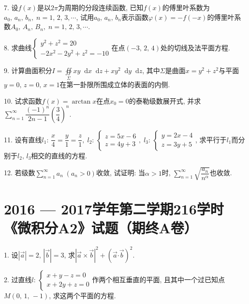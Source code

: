 \documentclass{article}
\newcommand*{\dif}{\mathop{}\!\mathrm{d}}
\begin{document}
7. 设$f(x)$是以$2\pi$为周期的分段连续函数, 已知$f(x)$的傅里叶系数为$a_0,\,a_n,\,b_n,\;n=1,\,2,\,3,\cdots$,  试用$a_0,\,a_n,\,b_n$表示函数$\varphi(x) = -f(-x)$的傅里叶系数$A_0,\,A_n,\,B_n,\;n=1,\,2,\,3,\cdots$.\par

8. 求曲线$\begin{cases}y^2+z^2=20 \\ -2x^2 -2y^2+z^2 = -10\end{cases}$在点$(-3,\,2,\,4)$处的切线及法平面方程.\par

9. 计算曲面积分$I= \displaystyle\oiint\limits_\Sigma{xy \dif x \dif z + xy^2 \dif y \dif z}$, 其中$\Sigma$是曲面$x=y^2+z^2$与平面$y=0,\,z=0,\,x=1$在第一卦限所围成立体的表面的内侧.\par

10. 试求函数$f(x)=\arctan x$在点$x_0 = 0$的泰勒级数展开式, 并求$\displaystyle\sum\limits_{n=1}^\infty{\dfrac{(-1)^n}{2n-1}\left(\dfrac{3}{4}\right)^n}$.\par

11. 设有直线$l_1:\, \dfrac{x}{4}=\dfrac{y}{1}=\dfrac{z}{1}, \; l_2:\, \begin{cases}z=5x-6 \\ z=4y+3\end{cases},\; l_3:\, \begin{cases}y=2x-4 \\ z=3y+5\end{cases}$, 求平行于$l_1$而分别于$l_2,\,l_3$相交的直线的方程.\par

12. 若级数$\displaystyle\sum\limits_{n=1}^\infty{a_n}\;(a_n>0)$收敛, 试证明: 当$\alpha > 1$时, $\displaystyle\sum\limits_{n=1}^\infty{\sqrt{\dfrac{a_n}{n^\alpha}}}$也收敛.\par

\newpage

\section*{2016 --- 2017学年第二学期216学时《微积分A2》试题（期终A卷）}
1. 设$|\vec{a}|=2,\, |\vec{b}|=3$, 求$|\vec{a} \times \vec{b}|^2 + (\vec{a} \bm\cdot \vec{b})^2$.\par

2. 过直线$l:\, \begin{cases}x+y-z=0 \\ x+2y+z=0 \end{cases}$作两个相互垂直的平面, 且其中一个过已知点$M(0,\,1,\,-1)$, 求这两个平面的方程.\par
\end{document}
